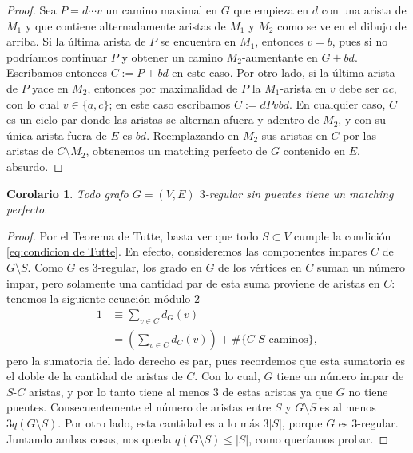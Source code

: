 \documentclass[12pt]{report}
\theoremstyle{plain}
\newtheorem{corollary}[theorem]{Corolario}
\theoremstyle{definition}
\newcommand{\abs}[1]{\left \vert #1 \right \vert}
\begin{document}
\begin{proof}

Sea $P = d \cdots v$ un camino maximal en $G$ que empieza en $d$ con una arista de $M_1$ y que contiene alternadamente aristas de $M_1$ y $M_2$ como se ve en el dibujo de arriba. Si la última arista de $P$ se encuentra en $M_1$, entonces $v = b$, pues si no podríamos continuar $P$ y obtener un camino $M_2$-aumentante en $G + bd$. Escribamos entonces $C := P + bd$ en este caso. Por otro lado, si la última arista de $P$ yace en $M_2$, entonces por maximalidad de $P$ la $M_1$-arista en $v$ debe ser $ac$, con lo cual $v \in \{a, c \}$; en este caso escribamos $C:= d P v b d$. En cualquier caso, $C$ es un ciclo par donde las aristas se alternan afuera y adentro de $M_2$, y con su única arista fuera de $E$ es $bd$. Reemplazando en $M_2$ sus aristas en $C$ por las aristas de $C \setminus M_2$, obtenemos un matching perfecto de $G$ contenido en $E$, absurdo.
\end{proof}



\begin{corollary}\label{corolario:todo grafo 3-regular tiene un matching perfecto}
Todo grafo $G = (V,E)$ $3$-regular sin puentes tiene un matching perfecto.
\end{corollary}
\begin{proof}
Por el Teorema de Tutte, basta ver que todo $S \subset V$ cumple la condición \eqref{eq:condicion de Tutte}. En efecto, consideremos las componentes impares $C$ de $G\setminus S$. Como $G$ es $3$-regular, los grado en $G$ de los vértices en $C$ suman un número impar, pero solamente una cantidad par de esta suma proviene de aristas en $C$: tenemos la siguiente ecuación módulo $2$
\begin{align*}
1 &\equiv \sum_{v \in C} d_G (v)\\
&= \left ( \sum_{v \in C}  d_C (v)\right) + \# \{\text{$C$-$S$ caminos}\},
\end{align*}
pero la sumatoria del lado derecho es par, pues recordemos que esta sumatoria es el doble de la cantidad de aristas de $C$.
Con lo cual, $G$ tiene un número impar de $S$-$C$ aristas, y por lo tanto tiene al menos $3$ de estas aristas ya que $G$ no tiene puentes. Consecuentemente el número de aristas entre $S$ y $G\setminus S$ es al menos $3 q (G\setminus S)$. Por otro lado, esta cantidad es a lo más $3 \abs S$, porque $G$ es $3$-regular. Juntando ambas cosas, nos queda $q ( G\setminus S) \leq \abs S$, como queríamos probar.
\end{proof}
\end{document}

